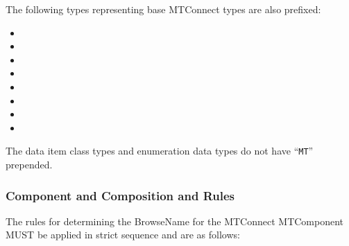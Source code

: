 The following types representing base MTConnect types are also prefixed:

\begin{itemize}
  \setlength\itemsep{0em}
  \item {}
  \item {}
  \item {}
  \item {}
  \item {}
  \item {}
  \item {}
  \item {}
\end{itemize}

The data item class types and enumeration data types do not have ``\texttt{MT}'' prepended.

\subsubsection{Component and Composition  and  Rules} \label{sec:browse-name-rules}

The rules for determining the \gls{BrowseName} for the MTConnect \gls{MTComponent} MUST be applied in strict sequence and are as follows:


